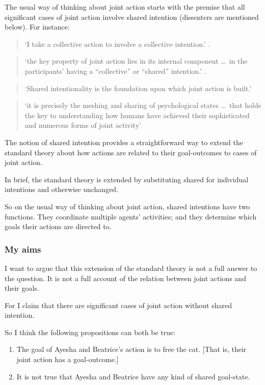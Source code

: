 \documentclass[14pt,a4paper]{extarticle}
\begin{document}
The usual way of thinking about joint action starts with the premise that all significant cases of joint action involve shared intention (dissenters are mentioned below).  For instance:  
%
\begin{quote} 
`I take a collective action to involve a collective intention.'  \citep[p.\ 5]{Gilbert:2006wr}.
\end{quote}
%
\begin{quote}
`the key property of joint action lies in its internal component \ldots \ in the participants’ having a ``collective'' or ``shared'' intention.' \citep[pp. 444-5]{alonso_shared_2009}.
\end{quote}
%
\begin{quote}
`Shared intentionality is the foundation upon which joint action is built.' \citep[p.\ 381]{Carpenter:2009wq}
\end{quote}
%
\begin{quote}
`it is precisely the meshing and sharing of psychological states \ldots \ that holds the key to understanding how humans have achieved their sophisticated and numerous forms of joint activity'
\citep[p.\ 369]{Call:2009fk}
\end{quote}

The notion of shared intention provides a straightforward way to extend the standard theory about how actions are related to their goal-outcomes to cases of joint action.

In brief, the standard theory is extended by substituting shared for individual intentions and otherwise unchanged.  

So on the usual way of thinking about joint action, shared intentions have two functions.  They coordinate multiple agents' activities; and they determine which goals their actions are directed to.


\subsubsection{My aims}
I want to argue that this extension of the standard theory is not a full answer to the question.  It is not a full account of the relation between joint actions and their goals.

For I claim that there are significant cases of joint action without shared intention.

So I think the following propositions can both be true:

\begin{enumerate}

\item The goal of Ayesha and Beatrice's action is to free the cat.  [That is, their joint action has a goal-outcome.]

\item It is not true that Ayesha and Beatrice have any kind of  shared goal-state.  

\end{enumerate}
\end{document}

